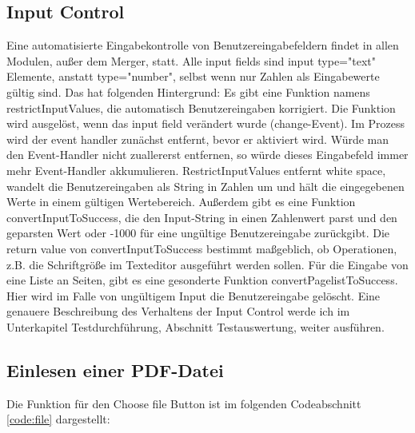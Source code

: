 \subsection{Input Control}
Eine automatisierte Eingabekontrolle von Benutzereingabefeldern findet in allen Modulen, außer dem Merger, statt. Alle input fields sind input type="text" Elemente, anstatt type="number", selbst wenn nur Zahlen als Eingabewerte gültig sind. Das hat folgenden Hintergrund: Es gibt eine Funktion namens restrictInputValues, die automatisch Benutzereingaben korrigiert. Die Funktion wird ausgelöst, wenn das input field verändert wurde (change-Event). Im Prozess wird der event handler zunächst entfernt, bevor er aktiviert wird. Würde man den Event-Handler nicht zuallererst entfernen, so würde dieses Eingabefeld immer mehr Event-Handler akkumulieren. RestrictInputValues entfernt white space, wandelt die Benutzereingaben als String in Zahlen um und hält die eingegebenen Werte in einem gültigen Wertebereich. Außerdem gibt es eine Funktion convertInputToSuccess, die den Input-String in einen Zahlenwert parst und den geparsten Wert oder -1000 für eine ungültige Benutzereingabe zurückgibt. Die return value von convertInputToSuccess bestimmt maßgeblich, ob Operationen, z.B. die Schriftgröße im Texteditor ausgeführt werden sollen. Für die Eingabe von eine Liste an Seiten, gibt es eine gesonderte Funktion convertPagelistToSuccess. Hier wird im Falle von ungültigem Input die Benutzereingabe gelöscht. Eine genauere Beschreibung des Verhaltens der Input Control werde ich im Unterkapitel Testdurchführung, Abschnitt Testauswertung, weiter ausführen.

\subsection{Einlesen einer PDF-Datei}
Die Funktion für den Choose file Button ist im folgenden Codeabschnitt \ref{code:file} dargestellt:

